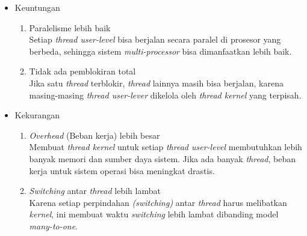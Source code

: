 \documentclass[12pt]{article}
\begin{document}
\begin{enumerate}
    \begin{itemize}
        \item Keuntungan \\
        \begin{enumerate}
            \item Paralelisme lebih baik \\
                Setiap \textit{thread user-level} bisa berjalan secara paralel di prosesor yang berbeda, sehingga sistem \textit{multi-processor} bisa dimanfaatkan lebih baik.
            \item Tidak ada pemblokiran total \\
                Jika satu \textit{thread} terblokir, \textit{thread} lainnya masih bisa berjalan, karena masing-masing \textit{thread user-lever} dikelola oleh \textit{thread kernel} yang terpisah.
        \end{enumerate}
        \item Kekurangan \\
        \begin{enumerate}
            \item \textit{Overhead} (Beban kerja) lebih besar \\
                Membuat \textit{thread kernel} untuk setiap \textit{thread user-level} membutuhkan lebih banyak memori dan sumber daya sistem. Jika ada banyak \textit{thread}, beban kerja untuk sistem operasi bisa 
                meningkat drastis.
            \item \textit{Switching} antar \textit{thread} lebih lambat \\
                Karena setiap perpindahan \textit{(switching)} antar \textit{thread} harus melibatkan \textit{kernel}, ini membuat waktu \textit{switching} lebih lambat dibanding model \textit{many-to-one}.
        \end{enumerate}
    \end{itemize}


\end{enumerate}
\end{document}
